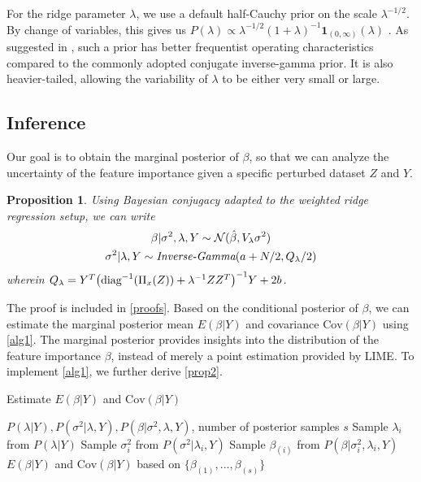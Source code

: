 \documentclass{article}
\theoremstyle{plain}
\newtheorem{proposition}[theorem]{Proposition}
\theoremstyle{definition}
\theoremstyle{remark}
\begin{document}
For the ridge parameter $\lambda$, we use a default half-Cauchy prior on the scale $\lambda^{-1/2}$. By change of variables, this gives us $P(\lambda)\propto\lambda^{-1/2}(1+\lambda)^{-1} \mathbf{1}_{(0,\infty)}(\lambda)$ . As suggested in \cite{sigmaprior, polson2012}, such a prior %
has better frequentist operating characteristics compared to the commonly adopted conjugate inverse-gamma prior. It is also heavier-tailed, allowing the variability of $\lambda$ to be either very small or large. 

\subsection{Inference} 
Our goal is to obtain the marginal posterior of $\beta$, so that we can analyze the uncertainty of the feature importance given a specific perturbed dataset $Z$ and $Y$.

\begin{proposition} \label{prop0}
Using Bayesian conjugacy adapted to the weighted ridge regression setup, we can write
\begin{gather}
    \beta|\sigma^2, \lambda, Y \sim \mathcal{N}(\hat{\beta}, V_\lambda \sigma^2) \label{beta_cond_pos}\\
    \sigma^2|\lambda,Y \sim \textit{\textrm{Inverse-Gamma}}(a+N/2,Q_{\lambda}/2) \label{sigma_cond_pos}
\end{gather}
wherein $Q_{\lambda} = Y^T\big(\normalfont{\textrm{diag}}^{-1}(\Pi_x(Z))+\lambda^{-1}ZZ^T\big)^{-1}Y + 2b$. 
\end{proposition}

The proof is included in \cref{proofs}. Based on the conditional posterior of $\beta$, we can estimate the marginal posterior mean $E(\beta|Y)$ and covariance $\textrm{Cov}(\beta|Y)$ using \cref{alg1}. The marginal posterior provides insights into the distribution of the feature importance $\beta$, instead of merely a point estimation provided by LIME. To implement \cref{alg1}, we further derive \cref{prop2}.

\begin{algorithm}[htb]
   \caption{Estimate $E(\beta|Y)$ and $\textrm{Cov}(\beta|Y)$}
   \label{alg1}
\begin{algorithmic}[1]
    $P(\lambda|Y), P(\sigma^2|\lambda,Y), P(\beta|\sigma^2,\lambda,Y)$, number of posterior samples $s$
   \STATE Sample $\lambda_i$ from $P(\lambda|Y)$ 
   \STATE Sample $\sigma^2_i$ from  $P(\sigma^2|\lambda_i,Y)$
   \STATE Sample $\beta_{(i)}$ from  $P(\beta|\sigma^2_i,\lambda_i,Y)$
   \ENDFOR
    $E(\beta|Y)$ and $\textrm{Cov}(\beta|Y)$ based on $\{\beta_{(1)},...,\beta_{(s)}\}$
\end{algorithmic}
\end{algorithm}
\end{document}
